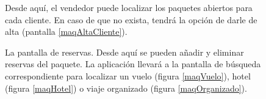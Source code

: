 \documentclass[12pt,a4paper,titlepage]{article}
\begin{document}
\begin{figure}[hbtp]   
	\begin{center} 
		\caption{Desde aquí, el vendedor puede localizar los paquetes abiertos para cada cliente. En caso de que no exista, tendrá la opción de darle de alta (pantalla \ref{maqAltaCliente}).} 
	\end{center}  
\end{figure}

\begin{figure}[hbtp]   
	\begin{center} 
		\caption{La pantalla de reservas. Desde aquí se pueden añadir y eliminar reservas del paquete. La aplicación llevará a la pantalla de búsqueda correspondiente para localizar un vuelo (figura \ref{maqVuelo}), hotel (figura \ref{maqHotel}) o viaje organizado (figura \ref{maqOrganizado}). } 
	\end{center}  
\end{figure}
\end{document}
